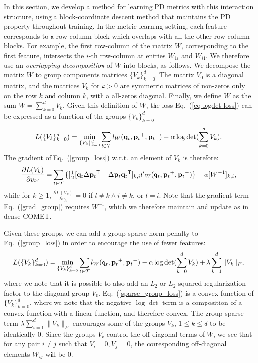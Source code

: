 \documentclass[twoside,11pt]{article}
\newcommand\mat[1]{{#1}}
\renewcommand\vec[1]{\mathbf{#1}}
\newcommand{\T}{{}^\mathsf{T}}
\newcommand{\W}{\mat{W}}
\newcommand{\q}{{\vec{q}}}
\newcommand{\p}{{\vec{p}}}
\newcommand{\trip}{{t}}
\newcommand{\qt}{{\q_{\trip}}}
\newcommand{\pt}{{\p_{\trip}}}
\newcommand{\triplet}{(\qt, \pt^{+}, \pt^{-})}
\newcommand{\Vk}{\mat{V_k}}
\newcommand{\Vg}{\{\Vk\}_{k=0}^{d}} %
\renewcommand{\eqref}[1]{Eq.~(\ref{#1})}
\begin{document}
In this section, we develop a method for learning PD metrics with this interaction structure, using a block-coordinate descent method that maintains the PD property throughout training.
In the metric learning setting, each feature corresponds to a row-column block which overlaps with all the other row-column blocks. For example, the first row-column of the matrix $\W$, corresponding to the first feature, intersects the $i$-th row-column at entries $W_{1i}$ and $W_{i1}$. We therefore use an \emph{overlapping decomposition} \citep{jacob2009group,obozinski2011group} of $W$ into blocks, as follows. 
We decompose the matrix $\W$ to group components matrices $\Vg$. The matrix $V_0$ is a diagonal matrix, and the matrices $V_k$ for $k>0$ are symmetric matrices of non-zeros only on the row $k$ and column $k$, with a all-zeros diagonal. Finally, we define $\W$ as the sum $\W = \sum_{k=0}^{d}{\Vk}$.
Given this definition of $\W$, the loss \eqref{eq-logdet-loss} can be expressed as a function of the groups $\Vg$:
\begin{equation}
L(\Vg) = 
  \min_{\Vg} \sum_{\trip \in \cal{T}}   l_{\W}(\qt, \pt^+, \pt^-) - \alpha \log \det(\sum_{k=0}^{d}{\Vk}).
  \label{group_loss}
\end{equation} 
The gradient of \eqref{group_loss} w.r.t. an element of $\mat{V}_k$ is therefore:
\begin{equation}
  \frac{\partial {L (V_k)}}{\partial v_{ki}} = \sum\limits_{t\in \cal{T}}{\{
  [\tfrac{1}{2}[\q_{t}\Delta\p_{t}\T + \Delta\p_{t}\q_{t}\T]_{k,i}  }
  {l'}_W\triplet\} - \alpha [\W^{-1}]_{k,i},
  \label{grad_group}
\end{equation}
while for $k \geq 1$, $\frac{\partial {L (V_k)}}{\partial v_{li}}=0$ if  $l \neq k \wedge i \neq k$, or $l=i$. Note that the gradient term \eqref{grad_group} requires $\W^{-1}$, which we therefore maintain and update as in dense COMET.

Given these groups, we can add a group-sparse norm penalty to \eqref{group_loss} in order to encourage the use of fewer features:
\begin{equation}
L(\Vg) = 
  \min_{\Vg} \sum_{\trip \in \cal{T}}   l_{\W}(\qt, \pt^+, \pt^-) - \alpha \log \det(\sum_{k=0}^{d}{\Vk}) + \lambda \sum_{k=1}^d \|V_k\|_F,
  \label{sparse_group_loss}
\end{equation} 
where we note that it is possible to also add an $L_2$ or $L_2$-squared regularization factor to the diagonal group $V_0$. \eqref{sparse_group_loss} is a convex function of $\Vg$, where we note that the negative $\log \det$ term is a composition of a convex function with a linear function, and therefore convex.
The group sparse term $\lambda \sum_{i=1}^d \|V_k\|_F$ encourages some of the groups $V_k$, $1\leq k \leq d$ to be identically $0$. Since the groups $V_k$ control the off-diagonal terms of $W$, we see that for any pair $i\neq j$ such that $V_i=0, V_j=0$, the corresponding off-diagonal elements $W_{ij}$ will be $0$. 
\end{document}

